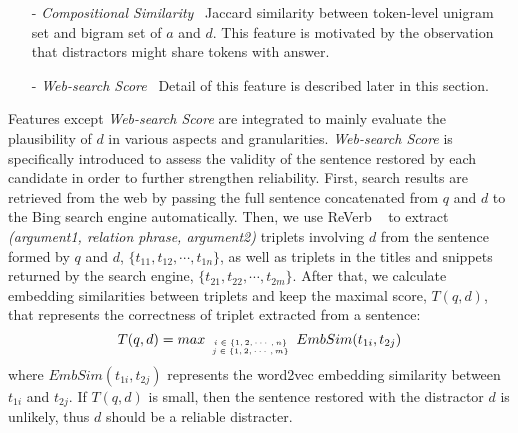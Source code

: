 \begin{itemize}
	\item[-] \textit{Compositional Similarity} ~Jaccard similarity between token-level
unigram set and bigram set of $a$ and $d$. This feature is motivated 
by the observation that distractors might share tokens with answer.
	\item[-] \textit{Web-search Score} ~Detail of this feature is described later in this section.
\end{itemize} 

Features except \textit{Web-search Score} are integrated to mainly evaluate the plausibility of $d$ in various aspects and granularities. \textit{Web-search Score} is specifically introduced to assess
the validity of the sentence restored by each candidate in order to further strengthen reliability.  
First, search results are retrieved from the web by passing the full sentence 
concatenated from $q$ and $d$ to the Bing search engine automatically. 
Then, we use ReVerb ~\cite{fader2011identifying} to 
extract \textit{(argument1, relation phrase, argument2)} triplets 
involving $d$ from the sentence formed by $q$ and 
$d$, $\{t_{11}, t_{12}, \cdots, t_{1n}\}$, 
as well as triplets in the titles and snippets returned by the search engine, 
$\{t_{21}, t_{22}, \cdots, t_{2m}\}$. 
After that, we calculate embedding similarities 
between triplets and keep the maximal score, 
$T(q,d)$, that represents the correctness of triplet extracted from a sentence:
\begin{equation*}
	T(q,d) = max_{\tiny \begin{array}{c}
	i\in \{1,2,\cdots,n\} \\ j \in \{1,2,\cdots,m\}
	\end{array}
	} EmbSim(t_{1i}, t_{2j})
\end{equation*}
where $EmbSim(t_{1i}, t_{2j})$ represents the word2vec embedding similarity between $t_{1i}$ and $t_{2j}$.
If $T(q,d)$ is small, then the sentence restored with the distractor $d$ is unlikely, thus $d$ should be a reliable distracter. 

